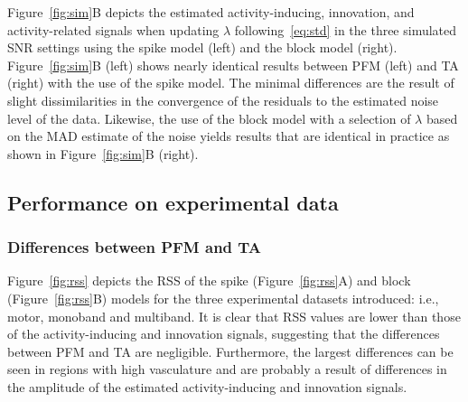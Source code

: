 
 Figure~\ref{fig:sim}B depicts the estimated activity-inducing, innovation, and activity-related signals when updating \(\lambda\) following~\eqref{eq:std} in the three simulated SNR settings using the spike model (left) and the block model (right). Figure~\ref{fig:sim}B (left) shows nearly identical results between PFM (left) and TA (right) with the use of the spike model. The minimal differences are the result of slight dissimilarities in the convergence of the residuals to the estimated noise level of the data. Likewise, the use of the block model with a selection of \(\lambda\) based on the MAD estimate of the noise yields results that are identical in practice as shown in Figure~\ref{fig:sim}B (right).

\subsection{Performance on experimental data}

\subsubsection{Differences between PFM and TA}

Figure~\ref{fig:rss} depicts the RSS of the spike (Figure~\ref{fig:rss}A) and block (Figure~\ref{fig:rss}B) models for the three experimental datasets introduced: i.e., motor, monoband and multiband. It is clear that RSS values are lower than those of the activity-inducing and innovation signals, suggesting that the differences between PFM and TA are negligible. Furthermore, the largest differences can be seen in regions with high vasculature and are probably a result of differences in the amplitude of the estimated activity-inducing and innovation signals. 

